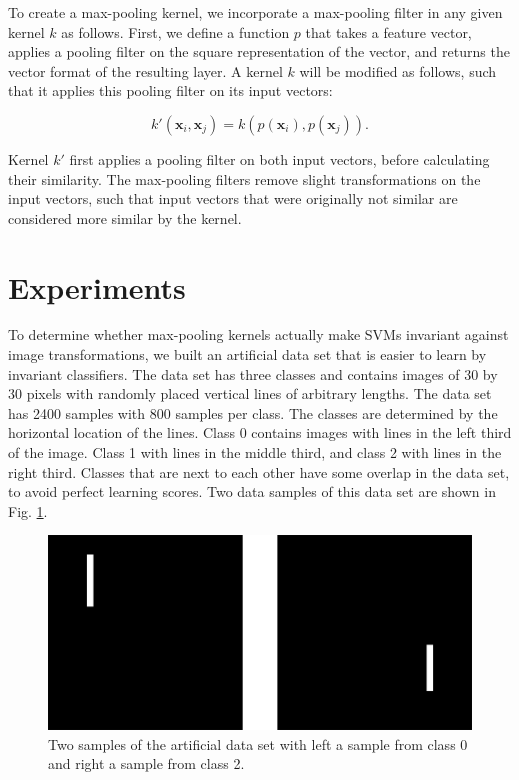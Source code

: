 \documentclass[10pt,twocolumn,letterpaper]{article}
\begin{document}
To create a max-pooling kernel, we incorporate a max-pooling filter in any given kernel $k$ as follows.
First, we define a function $p$ that takes a feature vector, applies a pooling filter on the square representation of the vector, and returns the vector format of the resulting layer.
A kernel $k$ will be modified as follows, such that it applies this pooling filter on its input vectors:

\begin{equation}
	k'(\textbf{x}_i, \textbf{x}_j) =  k(p(\textbf{x}_i), p(\textbf{x}_j)).
\end{equation}

\noindent Kernel $k'$ first applies a pooling filter on both input vectors, before calculating their similarity. 
The max-pooling filters remove slight transformations on the input vectors, such that input vectors that were originally not similar are considered more similar by the kernel.





\section{Experiments}

To determine whether max-pooling kernels actually make SVMs invariant against image transformations, we built an artificial data set that is easier to learn by invariant classifiers.  
The data set has three classes and contains images of 30 by 30 pixels with randomly placed vertical lines of arbitrary lengths. 
The data set has 2400 samples with 800 samples per class. 
The classes are determined by the horizontal location of the lines. 
Class 0 contains images with lines in the left third of the image. Class 1 with lines in the middle third, and class 2 with lines in the right third. 
Classes that are next to each other have some overlap in the data set, to avoid perfect learning scores. 
Two data samples of this data set are shown in Fig. \ref{lines}.

\begin{figure}[H]
\begin{center}
\includegraphics[draft=false, width=0.95\columnwidth]{images/lines_2.png}
\end{center}
\caption{Two samples of the artificial data set with left a sample from class 0 and right a sample from class 2.}
\label{lines}
\end{figure}
\end{document}
